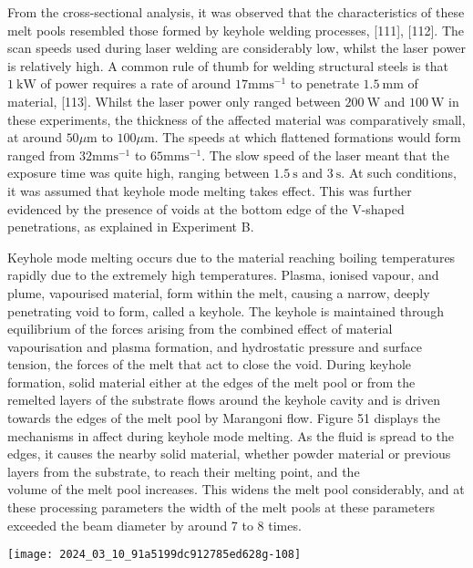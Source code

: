 \documentclass[10pt]{article}
\begin{document}
From the cross-sectional analysis, it was observed that the characteristics of these melt pools resembled those formed by keyhole welding processes, [111], [112]. The scan speeds used during laser welding are considerably low, whilst the laser power is relatively high. A common rule of thumb for welding structural steels is that $1 \mathrm{~kW}$ of power requires a rate of around $17 \mathrm{mms}^{-1}$ to penetrate $1.5 \mathrm{~mm}$ of material, [113]. Whilst the laser power only ranged between $200 \mathrm{~W}$ and $100 \mathrm{~W}$ in these experiments, the thickness of the affected material was comparatively small, at around $50 \mu \mathrm{m}$ to $100 \mu \mathrm{m}$. The speeds at which flattened formations would form ranged from $32 \mathrm{mms}^{-1}$ to $65 \mathrm{mms}^{-1}$. The slow speed of the laser meant that the exposure time was quite high, ranging between $1.5 \mathrm{~s}$ and $3 \mathrm{~s}$. At such conditions, it was assumed that keyhole mode melting takes effect. This was further evidenced by the presence of voids at the bottom edge of the $\mathrm{V}$-shaped penetrations, as explained in Experiment B.

Keyhole mode melting occurs due to the material reaching boiling temperatures rapidly due to the extremely high temperatures. Plasma, ionised vapour, and plume, vapourised material, form within the melt, causing a narrow, deeply penetrating void to form, called a keyhole. The keyhole is maintained through equilibrium of the forces arising from the combined effect of material vapourisation and plasma formation, and hydrostatic pressure and surface tension, the forces of the melt that act to close the void. During keyhole formation, solid material either at the edges of the melt pool or from the remelted layers of the substrate flows around the keyhole cavity and is driven towards the edges of the melt pool by Marangoni flow. Figure 51 displays the mechanisms in affect during keyhole mode melting. As the fluid is spread to the edges, it causes the nearby solid material, whether powder material or previous layers from the substrate, to reach their melting point, and the\\
volume of the melt pool increases. This widens the melt pool considerably, and at these processing parameters the width of the melt pools at these parameters exceeded the beam diameter by around 7 to 8 times.

\begin{center}
\texttt{[image: 2024\_03\_10\_91a5199dc912785ed628g-108]}
\end{center}
\end{document}
